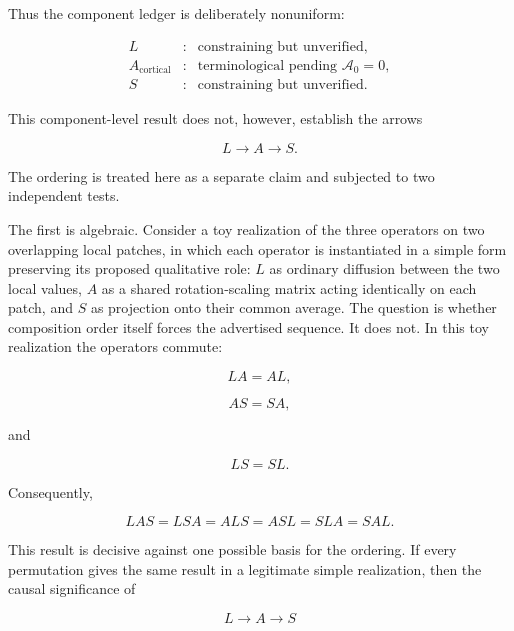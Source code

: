 \documentclass[11pt]{article}
\begin{document}
Thus the component ledger is deliberately nonuniform:

\begin{equation}
\begin{array}{rcl}
L &:& \text{constraining but unverified},\\[4pt]
A_{\mathrm{cortical}} &:& \text{terminological pending }\mathcal A_0=0,\\[4pt]
S &:& \text{constraining but unverified}.
\end{array}
\end{equation}

This component-level result does not, however, establish the arrows

\begin{equation}
L\longrightarrow A\longrightarrow S.
\end{equation}

The ordering is treated here as a separate claim and subjected to two independent tests.

The first is algebraic. Consider a toy realization of the three operators on two overlapping local patches, in which each operator is instantiated in a simple form preserving its proposed qualitative role: $L$ as ordinary diffusion between the two local values, $A$ as a shared rotation-scaling matrix acting identically on each patch, and $S$ as projection onto their common average. The question is whether composition order itself forces the advertised sequence. It does not. In this toy realization the operators commute:

\begin{equation}
LA=AL,
\end{equation}

\begin{equation}
AS=SA,
\end{equation}

and

\begin{equation}
LS=SL.
\end{equation}

Consequently,

\begin{equation}
LAS
=
LSA
=
ALS
=
ASL
=
SLA
=
SAL.
\end{equation}

This result is decisive against one possible basis for the ordering. If every permutation gives the same result in a legitimate simple realization, then the causal significance of

\begin{equation}
L\to A\to S
\end{equation}
\end{document}

